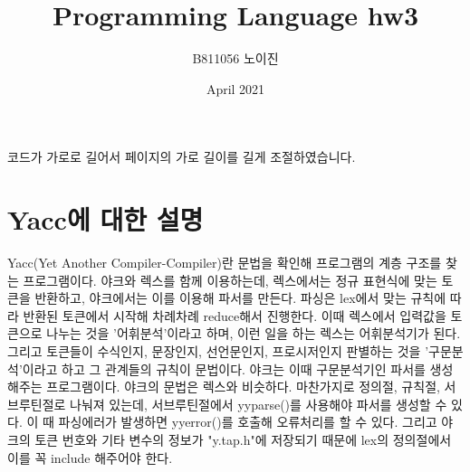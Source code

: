 \documentclass{article}
\title{Programming Language hw3}
\author{B811056 노이진}
\date{April 2021}
\begin{document}
\maketitle

코드가 가로로 길어서 페이지의 가로 길이를 길게 조절하였습니다.

\section{Yacc에 대한 설명}
Yacc(Yet Another Compiler-Compiler)란 문법을 확인해 프로그램의 계층 구조를 찾는 프로그램이다. \newline
야크와 렉스를 함께 이용하는데, 렉스에서는 정규 표현식에 맞는 토큰을 반환하고, 야크에서는 이를 이용해 파서를 만든다. 파싱은 lex에서 맞는 규칙에 따라 반환된 토큰에서 시작해 차례차례 reduce해서 진행한다. 이때 렉스에서 입력값을 토큰으로 나누는 것을 '어휘분석'이라고 하며, 이런 일을 하는 렉스는 어휘분석기가 된다. 그리고 토큰들이 수식인지, 문장인지, 선언문인지, 프로시저인지 판별하는 것을 '구문분석'이라고 하고 그 관계들의 규칙이 문법이다. 야크는 이때 구문분석기인 파서를 생성해주는 프로그램이다. 야크의 문법은 렉스와 비슷하다. 마찬가지로 정의절, 규칙절, 서브루틴절로 나눠져 있는데, 서브루틴절에서 yyparse()를 사용해야 파서를 생성할 수 있다. 이 때 파싱에러가 발생하면 yyerror()를 호출해 오류처리를 할 수 있다. 그리고 야크의 토큰 번호와 기타 변수의 정보가 "y.tap.h"에 저장되기 때문에 lex의 정의절에서 이를 꼭 include 해주어야 한다.
\end{document}
